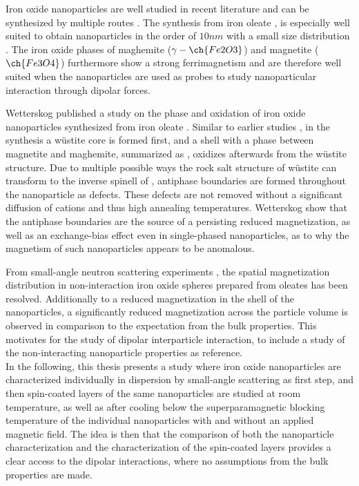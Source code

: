 \documentclass[\main/dresen_thesis.tex]{subfiles}
\begin{document}
  Iron oxide nanoparticles are well studied in recent literature and can be synthesized by multiple routes \cite{Laurent_2008_Magne}.
  The synthesis from iron oleate \cite{Hyeon_2003_Chemi}, is especially well suited to obtain nanoparticles in the order of $10 \unit{nm}$ with a small size distribution \cite{Wetterskog_2014_Preci}.
  The iron oxide phases of maghemite ($\gamma-\ch{Fe2O3}$) and magnetite ($\ch{Fe3O4}$) furthermore show a strong ferrimagnetism and are therefore well suited when the nanoparticles are used as probes to study nanoparticular interaction through dipolar forces.

  Wetterskog \etal published a study on the phase and oxidation of iron oxide nanoparticles synthesized from iron oleate \cite{Wetterskog_2013_Anoma}.
  Similar to earlier studies \cite{Hai_2010_Sizec, Chen_2010_Chara}, in the synthesis a w\"ustite core is formed first, and a shell with a phase between magnetite and maghemite, summarized as , oxidizes afterwards from the w\"ustite structure.
  Due to multiple possible ways the rock salt structure of w\"ustite can transform to the inverse spinell of , antiphase boundaries are formed throughout the nanoparticle as defects.
  These defects are not removed without a significant diffusion of cations \cite{Margulies_1997_Origi} and thus high annealing temperatures.
  Wetterskog \etal show that the antiphase boundaries are the source of a persisting reduced magnetization, as well as an exchange-bias effect even in single-phased nanoparticles, as to why the magnetism of such nanoparticles appears to be anomalous.

  From small-angle neutron scattering experiments \cite{Disch_2012_Quant}, the spatial magnetization distribution in non-interaction iron oxide spheres prepared from oleates has been resolved.
  Additionally to a reduced magnetization in the shell of the nanoparticles, a significantly reduced magnetization across the particle volume is observed in comparison to the expectation from the bulk properties.
  This motivates for the study of dipolar interparticle interaction, to include a study of the non-interacting nanoparticle properties as reference.
  \\

  In the following, this thesis presents a study where iron oxide nanoparticles are characterized individually in dispersion by small-angle scattering as first step, and then spin-coated layers of the same nanoparticles are studied at room temperature, as well as after cooling below the superparamagnetic blocking temperature of the individual nanoparticles with and without an applied magnetic field.
  The idea is then that the comparison of both the nanoparticle characterization and the characterization of the spin-coated layers provides a clear access to the dipolar interactions, where no assumptions from the bulk properties are made.
\end{document}
